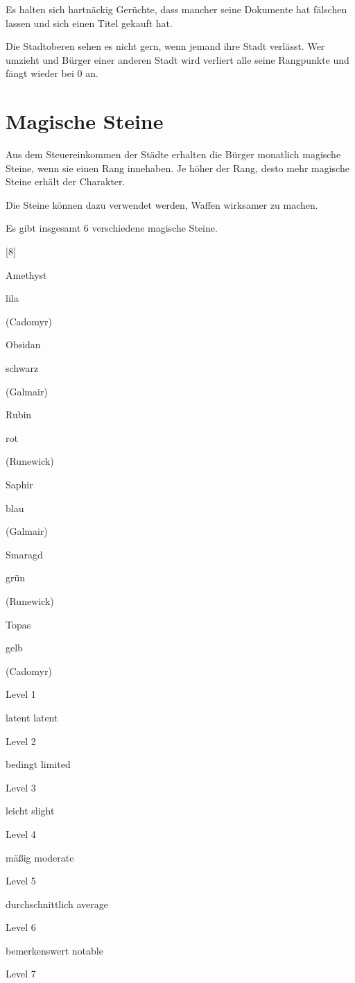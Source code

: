 \documentclass[a4paper,11pt]{book}
\begin{document}
Es halten sich hartnäckig Gerüchte, dass mancher seine Dokumente hat fälschen lassen und sich einen Titel gekauft hat.

Die Stadtoberen sehen es nicht gern, wenn jemand ihre Stadt verlässt. Wer umzieht und Bürger einer anderen Stadt wird verliert alle seine Rangpunkte und fängt wieder bei 0 an.

\section{Magische Steine}

Aus dem Steuereinkommen der Städte erhalten die Bürger monatlich magische Steine, wenn sie einen Rang innehaben. Je höher der Rang, desto mehr magische Steine erhält der Charakter.

Die Steine können dazu verwendet werden, Waffen wirksamer zu machen.

Es gibt insgesamt 6 verschiedene magische Steine.

[8]

Amethyst

lila

(Cadomyr)

Obsidan

schwarz

(Galmair)

Rubin

rot

(Runewick)

Saphir

blau

(Galmair)

Smaragd

grün

(Runewick)

Topas

gelb

(Cadomyr)

Level 1

latent  latent

Level 2

bedingt  limited

Level 3

leicht  slight

Level 4

mäßig  moderate

Level 5

durchschnittlich average

Level 6

bemerkenswert notable

Level 7
\end{document}

